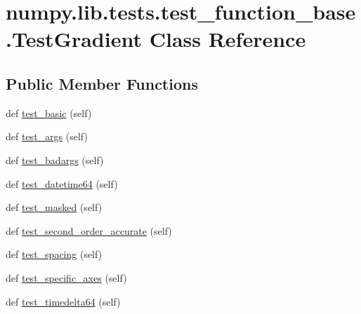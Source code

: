 \hypertarget{classnumpy_1_1lib_1_1tests_1_1test__function__base_1_1TestGradient}{}\section{numpy.\+lib.\+tests.\+test\+\_\+function\+\_\+base.\+Test\+Gradient Class Reference}
\label{classnumpy_1_1lib_1_1tests_1_1test__function__base_1_1TestGradient}
\subsection*{Public Member Functions}
\begin{DoxyCompactItemize}
\item 
def \hyperlink{classnumpy_1_1lib_1_1tests_1_1test__function__base_1_1TestGradient_a62405ed5e5ebc29546549936297e3de8}{test\+\_\+basic} (self)
\item 
def \hyperlink{classnumpy_1_1lib_1_1tests_1_1test__function__base_1_1TestGradient_a01d968d0e2012fc80b9e50ced7d3370c}{test\+\_\+args} (self)
\item 
def \hyperlink{classnumpy_1_1lib_1_1tests_1_1test__function__base_1_1TestGradient_ada61ba7695b1aa404b04e45f7b02ce6b}{test\+\_\+badargs} (self)
\item 
def \hyperlink{classnumpy_1_1lib_1_1tests_1_1test__function__base_1_1TestGradient_a854b652e5a0ddefb4e1c6d0617e6540e}{test\+\_\+datetime64} (self)
\item 
def \hyperlink{classnumpy_1_1lib_1_1tests_1_1test__function__base_1_1TestGradient_a8abd9bebf23c14af4bf1d395bf7ffe95}{test\+\_\+masked} (self)
\item 
def \hyperlink{classnumpy_1_1lib_1_1tests_1_1test__function__base_1_1TestGradient_a74ad1204e4106dede3463805010cded4}{test\+\_\+second\+\_\+order\+\_\+accurate} (self)
\item 
def \hyperlink{classnumpy_1_1lib_1_1tests_1_1test__function__base_1_1TestGradient_ac5c83a33f716a1aadace201faaa794af}{test\+\_\+spacing} (self)
\item 
def \hyperlink{classnumpy_1_1lib_1_1tests_1_1test__function__base_1_1TestGradient_a50040dfe6ef9bccb96eeed7f594e6af5}{test\+\_\+specific\+\_\+axes} (self)
\item 
def \hyperlink{classnumpy_1_1lib_1_1tests_1_1test__function__base_1_1TestGradient_a974f165b2052b6acc7d560ee8e7c50a9}{test\+\_\+timedelta64} (self)
\item 

\end{DoxyCompactItemize}
